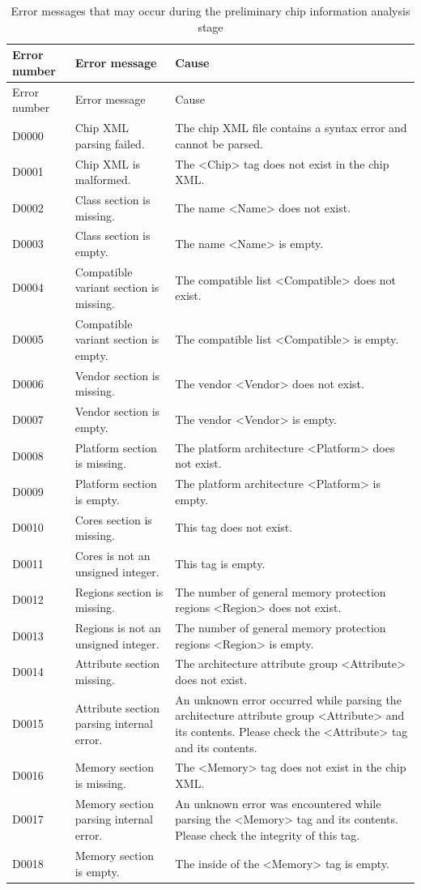 \begin{xltabular}{\textwidth}{@{}>{\hsize\raggedright\arraybackslash}X>{\hsize\raggedright\arraybackslash}X>{\hsize\raggedright\arraybackslash}X@{}}
\caption{Error messages that may occur during the preliminary chip information analysis stage}\label{tab:5-17}\\
\toprule
Error number & Error message & Cause\tabularnewline
\endfirsthead
\toprule
Error number & Error message & Cause\tabularnewline
\midrule
\endhead
\bottomrule
\endlastfoot
D0000 & Chip XML parsing failed. &
The chip XML file contains a syntax error and cannot be parsed.\tabularnewline
D0001 & Chip XML is malformed. &
The <Chip> tag does not exist in the chip XML.\tabularnewline
D0002 & Class section is missing. &
The name <Name> does not exist.\tabularnewline
D0003 & Class section is empty. &
The name <Name> is empty.\tabularnewline
D0004 & Compatible variant section is missing. &
The compatible list <Compatible> does not exist.\tabularnewline
D0005 & Compatible variant section is empty. &
The compatible list <Compatible> is empty.\tabularnewline
D0006 & Vendor section is missing. &
The vendor <Vendor> does not exist.\tabularnewline
D0007 & Vendor section is empty. &
The vendor <Vendor> is empty.\tabularnewline
D0008 & Platform section is missing. &
The platform architecture <Platform> does not exist.\tabularnewline
D0009 & Platform section is empty. &
The platform architecture <Platform> is empty.\tabularnewline
D0010 & Cores section is missing. & This tag does not exist.\tabularnewline
D0011 & Cores is not an unsigned integer. & This tag is empty.\tabularnewline
D0012 & Regions section is missing. &
The number of general memory protection regions <Region> does not exist.\tabularnewline
D0013 & Regions is not an unsigned integer. &
The number of general memory protection regions <Region> is empty.\tabularnewline
D0014 & Attribute section missing. &
The architecture attribute group <Attribute> does not exist.\tabularnewline
D0015 & Attribute section parsing internal error. &
An unknown error occurred while parsing the architecture attribute group <Attribute> and its contents. Please check the <Attribute> tag and its contents.\tabularnewline
D0016 & Memory section is missing. &
The <Memory> tag does not exist in the chip XML.\tabularnewline
D0017 & Memory section parsing internal error. &
An unknown error was encountered while parsing the <Memory> tag and its contents. Please check the integrity of this tag.\tabularnewline
D0018 & Memory section is empty. &
The inside of the <Memory> tag is empty.\tabularnewline

\end{xltabular}
